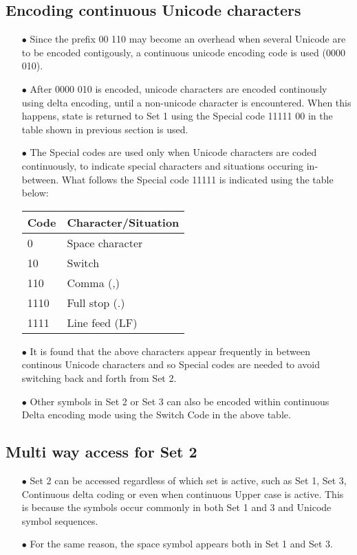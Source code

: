 \documentclass[]{article}
\begin{document}
\subsection{Encoding continuous Unicode characters}
\begin{itemize}
	\item[$\bullet$] Since the prefix 00 110 may become an overhead when several Unicode are to be encoded contigously, a continuous unicode encoding code is used (0000 010).
	\item[$\bullet$] After 0000 010 is encoded, unicode characters are encoded continously using delta encoding, until a non-unicode character is encountered.  When this happens, state is returned to Set 1 using the Special code 11111 00 in the table shown in previous section is used.
	\item[$\bullet$] The Special codes are used only when Unicode characters are coded continuously, to indicate special characters and situations occuring in-between. What follows the Special code 11111 is indicated using the table below:
	\item[] \begin{tabular}{ | l | l |} \hline
	\textbf{Code} & \textbf{Character/Situation} \\ \hline
	0 & Space character \\ \hline
	10 & Switch \\ \hline
	110 & Comma (,) \\ \hline
	1110 & Full stop (.) \\ \hline
	1111 & Line feed (LF) \\ \hline
    \end{tabular}
	\item[$\bullet$] It is found that the above characters appear frequently in between continous Unicode characters and so Special codes are needed to avoid switching back and forth from Set 2.
	\item[$\bullet$] Other symbols in Set 2 or Set 3 can also be encoded within continuous Delta encoding mode using the Switch Code in the above table.
\end{itemize}

\subsection{Multi way access for Set 2}
\begin{itemize}
	\item[$\bullet$] Set 2 can be accessed regardless of which set is active, such as Set 1, Set 3, Continuous delta coding or even when continuous Upper case is active.  This is because the symbols occur commonly in both Set 1 and 3 and Unicode symbol sequences.
	\item[$\bullet$] For the same reason, the space symbol appears both in Set 1 and Set 3.
\end{itemize}
\end{document}
